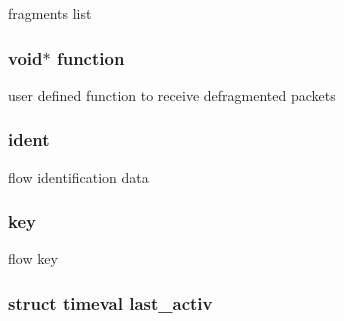fragments list 

\hypertarget{structntoh__ipv4__flow__t_aea3dcf0c8de30d192ee92494131c4996}{
\subsubsection[{function}]{\setlength{\rightskip}{0pt plus 5cm}void$\ast$ function}}\label{structntoh__ipv4__flow__t_aea3dcf0c8de30d192ee92494131c4996}


user defined function to receive defragmented packets 

\hypertarget{structntoh__ipv4__flow__t_a3d4334cd1cad89d0b3401c65411a9cad}{
\subsubsection[{ident}]{ ident}}\label{structntoh__ipv4__flow__t_a3d4334cd1cad89d0b3401c65411a9cad}


flow identification data 

\hypertarget{structntoh__ipv4__flow__t_a93bab182dfe815bbd3f8bd00a6a4d4f7}{
\subsubsection[{key}]{ key}}\label{structntoh__ipv4__flow__t_a93bab182dfe815bbd3f8bd00a6a4d4f7}


flow key 

\hypertarget{structntoh__ipv4__flow__t_a9d115049a50ba4e69eb04c23c973a4a2}{
\subsubsection[{last\-\_\-activ}]{\setlength{\rightskip}{0pt plus 5cm}struct timeval last\-\_\-activ}}\label{structntoh__ipv4__flow__t_a9d115049a50ba4e69eb04c23c973a4a2}


